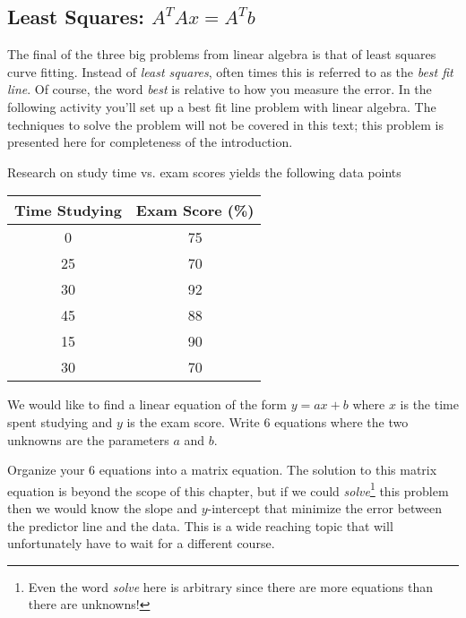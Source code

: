 \subsection*{Least Squares: $A^T A x = A^T b$}
The final of the three big problems from linear algebra is that of least squares curve
fitting.  Instead of {\it least squares}, often times this is referred to as the {\it best
fit line}.  Of course, the word {\it best} is relative to how you measure the error.  In
the following activity you'll set up a best fit line problem with linear algebra.
The techniques to solve the problem will not be covered in this text; this problem is
presented here for completeness of the introduction.

% 
\begin{problem}
Research on study time vs. exam scores yields the following data points
\begin{center}
    \begin{tabular}{|c|c|}
        \hline
        Time Studying & Exam Score (\%) \\ \hline \hline
        0 & 75 \\
        25 & 70 \\
        30 & 92 \\
        45 & 88 \\
        15 & 90 \\
        30 & 70 \\ \hline
    \end{tabular}
\end{center}

\ba
    \item We would like to find a linear equation of the form $y=ax + b$ where $x$ is the
        time spent studying and $y$ is the exam score.  Write 6 equations where the two
        unknowns are the parameters $a$ and $b$.
    \item Organize your 6 equations into a matrix equation.  The solution to this matrix
        equation is beyond the scope of this chapter, but if we could {\it
        solve}\footnote{Even the word {\it solve} here is arbitrary since there are more
    equations than there are unknowns!} this problem then we would know the slope and
    $y$-intercept that minimize the error between the predictor line and the data.  This
    is a wide reaching topic that will unfortunately have to wait for a different course.
\ea
\end{problem}



